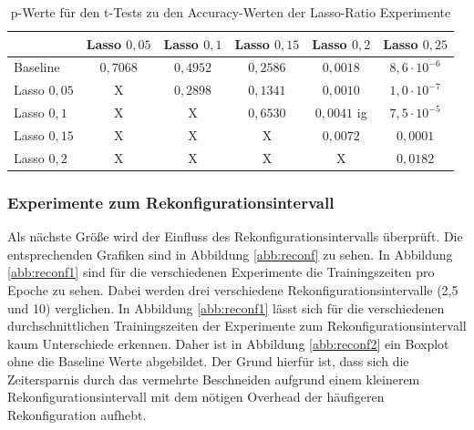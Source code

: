 \begin{table}[]
\caption{p-Werte für den t-Tests zu den Accuracy-Werten der Lasso-Ratio Experimente}
\centering
\begin{tabular}{l|c|c|c|c|c|}
\cline{2-6}
                                & \multicolumn{1}{l|}{Lasso $0,05$} & \multicolumn{1}{l|}{Lasso $0,1$} & \multicolumn{1}{l|}{Lasso $0,15$} & \multicolumn{1}{l|}{Lasso $0,2$} & \multicolumn{1}{l|}{Lasso $0,25$} \\ \hline
\multicolumn{1}{|l|}{Baseline}   & \cellcolor[HTML]{FE0000}$0,7068$  & \cellcolor[HTML]{FE0000}$0,4952$ & \cellcolor[HTML]{FE0000}$0,2586$  & $0,0018$                         & $8,6\cdot 10^{-6}$     \\ \hline
\multicolumn{1}{|l|}{Lasso $0,05$}& X                               & \cellcolor[HTML]{FE0000}$0,2898$ & \cellcolor[HTML]{FE0000}$0,1341$  & $0,0010$                       & $1,0\cdot 10^{-7}$    \\ \hline
\multicolumn{1}{|l|}{Lasso $0,1$} & X                               & X                              & \cellcolor[HTML]{FE0000}$0,6530$   & $0,0041$         ig              & $7,5\cdot10^{-5}$    \\ \hline
\multicolumn{1}{|l|}{Lasso $0,15$}& X                               & X                              & X                               & $0,0072$                       & $0,0001$                       \\ \hline
\multicolumn{1}{|l|}{Lasso $0,2$} & X                               & X                              & X                               & X                              & $0,0182$                         \\ \hline
\end{tabular}
\label{tab:lasso2}
\end{table}



\subsubsection{Experimente zum Rekonfigurationsintervall}
 Als nächste Größe wird der Einfluss des Rekonfigurationsintervalls überprüft. Die entsprechenden Grafiken sind in Abbildung \ref{abb:reconf} zu sehen. In Abbildung \ref{abb:reconf1} sind für die verschiedenen Experimente die Trainingszeiten pro Epoche zu sehen. Dabei werden drei verschiedene Rekonfigurationsintervalle (2,5 und 10) verglichen. In Abbildung \ref{abb:reconf1} lässt sich für die verschiedenen durchschnittlichen Trainingszeiten der Experimente zum Rekonfigurationsintervall kaum Unterschiede erkennen. Daher ist in Abbildung \ref{abb:reconf2} ein Boxplot ohne die Baseline Werte abgebildet. Der Grund hierfür ist, dass sich die Zeitersparnis durch das vermehrte Beschneiden aufgrund einem kleinerem Rekonfigurationsintervall mit dem nötigen Overhead der häufigeren Rekonfiguration aufhebt.
 

